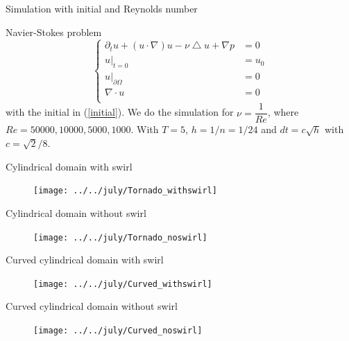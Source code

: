 \documentclass{beamer}
\begin{document}
\begin{frame}{Simulation with initial and Reynolds number}
\begin{block}{Navier-Stokes problem}
	\begin{equation}\nonumber
	\begin{cases}
		\partial_{t} u + (u \cdot \nabla) u - \nu\bigtriangleup u + \nabla p &= 0\\
		u |_{t=0} &=u_{0} \\
		u |_{\partial\Omega} &= 0 \\
		\nabla \cdot u &= 0 \\
	\end{cases}
	\end{equation}
	with the initial in (\ref{initial}). We do the simulation for $ \nu = \dfrac{1}{Re} $, where $ Re = 50000, 10000, 5000, 1000 $. With $ T=5 $, $ h = 1/n = 1/24 $ and $ dt=c\sqrt{h} $ with $ c = \sqrt{2}/8 $.
\end{block}
\end{frame}

\begin{frame}{Cylindrical domain with swirl}
\begin{figure}
	\centering
	\texttt{[image: ../../july/Tornado\_withswirl]}
	\caption{}
	\label{fig:tornadowithswirl}
\end{figure}
\end{frame}

\begin{frame}{Cylindrical domain without swirl}
\begin{figure}
	\centering
	\texttt{[image: ../../july/Tornado\_noswirl]}
	\caption{}
	\label{fig:tornadonoswirl}
\end{figure}

\end{frame}

\begin{frame}{Curved cylindrical domain with swirl}
\begin{figure}
	\centering
	\texttt{[image: ../../july/Curved\_withswirl]}
	\caption{}
	\label{fig:curvedwithswirl}
\end{figure}
\end{frame}

\begin{frame}{Curved cylindrical domain without swirl}
\begin{figure}
	\centering
	\texttt{[image: ../../july/Curved\_noswirl]}
	\caption{}
	\label{fig:curvednoswirl}
\end{figure}

\end{frame}
\end{document}
